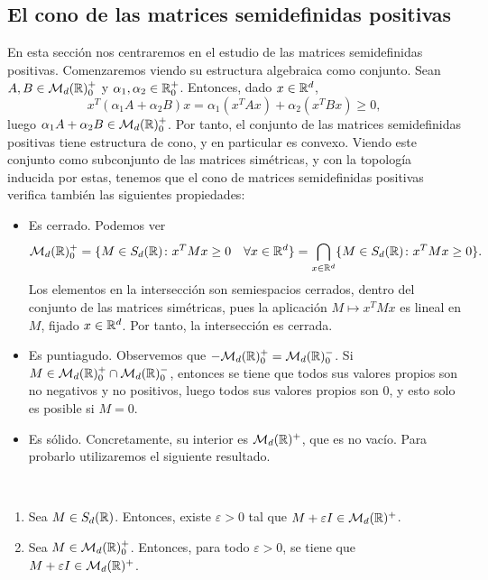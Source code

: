 \subsection{El cono de las matrices semidefinidas positivas}

En esta sección nos centraremos en el estudio de las matrices semidefinidas positivas. Comenzaremos viendo su estructura algebraica como conjunto. Sean $A, B \in \mathcal{M}_d(\mathbb{R})^+_0$ y $\alpha_1, \alpha_2 \in \mathbb{R}^+_0$. Entonces, dado $x \in \mathbb{R}^d$,
\[ x^T(\alpha_1A + \alpha_2B)x = \alpha_1(x^TAx) + \alpha_2(x^TBx) \ge 0, \]
luego $\alpha_1A + \alpha_2B \in \mathcal{M}_d(\mathbb{R})^+_0$. Por tanto, el conjunto de las matrices semidefinidas positivas tiene estructura de cono, y en particular es convexo. Viendo este conjunto como subconjunto de las matrices simétricas, y con la topología inducida por estas, tenemos que el cono de matrices semidefinidas positivas verifica también las siguientes propiedades:
\begin{itemize}
    \item Es cerrado. Podemos ver
    \[\mathcal{M}_d(\mathbb{R})^+_0 = \{ M \in S_d(\mathbb{R}) \colon x^TMx \ge 0 \quad \forall x \in \mathbb{R}^d \} = \bigcap_{x \in \mathbb{R}^d} \{ M \in S_d(\mathbb{R}) \colon x^T M x \ge 0 \}. \]
    Los elementos en la intersección son semiespacios cerrados, dentro del conjunto de las matrices simétricas, pues la aplicación $M \mapsto x^TMx$ es lineal en $M$, fijado $x \in \mathbb{R}^d$. Por tanto, la intersección es cerrada.
    \item Es puntiagudo. Observemos que $-\mathcal{M}_d(\mathbb{R})^+_0 = \mathcal{M}_d(\mathbb{R})^-_0$. Si $M \in \mathcal{M}_d(\mathbb{R})^+_0 \cap \mathcal{M}_d(\mathbb{R})^-_0$, entonces se tiene que todos sus valores propios son no negativos y no positivos, luego todos sus valores propios son $0$, y esto solo es posible si $M = 0$.

    \item Es sólido. Concretamente, su interior es $\mathcal{M}_d(\mathbb{R})^+$, que es no vacío. Para probarlo utilizaremos el siguiente resultado.
\end{itemize}

\begin{prop}~ \label{prop:pd_regularization}
    \begin{enumerate}
        \item Sea $M \in S_d(\mathbb{R})$. Entonces, existe $\varepsilon > 0$ tal que $M + \varepsilon I \in \mathcal{M}_d(\mathbb{R})^+$.
        \item Sea $M \in \mathcal{M}_d(\mathbb{R})^+_0$. Entonces, para todo $\varepsilon > 0$, se tiene que $M + \varepsilon I \in \mathcal{M}_d(\mathbb{R})^+$.
    \end{enumerate}
\end{prop}

